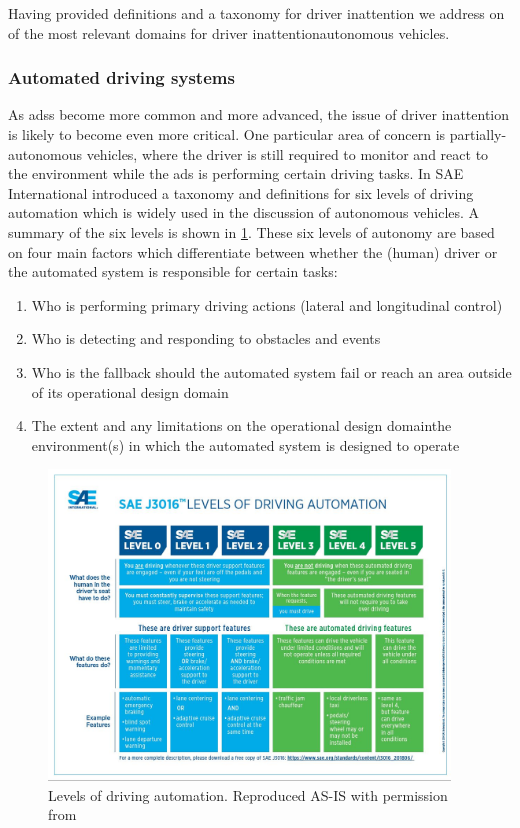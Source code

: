 \documentclass[11pt, parskip=half*,twoside=false]{scrbook}
\begin{document}
Having provided definitions and a taxonomy for driver inattention we address on of the most relevant domains for driver inattention\textemdash autonomous vehicles.

\subsubsection{Automated driving systems}
As \glspl{ads} become more common and more advanced, the issue of driver inattention is likely to become even more critical. One particular area of concern is partially-autonomous vehicles, where the driver is still required to monitor and react to the environment while the \gls{ads} is performing certain driving tasks.  In \citep{J3016_201806} SAE International introduced a taxonomy and definitions for six levels of driving automation which is widely used in the discussion of autonomous vehicles. A summary of the six levels is shown in \cref{fig:av_levels}. These six levels of autonomy are based on four main factors which differentiate between whether the (human) driver or the automated system is responsible for certain tasks: 

\begin{enumerate}
	\item Who is performing primary driving actions (lateral and longitudinal control) 
	\item Who is detecting and responding to obstacles and events
	\item Who is the fallback should the automated system fail or reach an area outside of its operational design domain
	\item The extent and any limitations on the operational design domain\textemdash the environment(s) in which the automated system is designed to operate
\end{enumerate}

\begin{figure} 
	\centering
	\includegraphics[width= 0.95\textwidth]{sae_av_levels} 
	\caption{Levels of driving automation. Reproduced AS-IS with permission from \citet{J3016_201806}}
	\label{fig:av_levels}
\end{figure}
\end{document}

